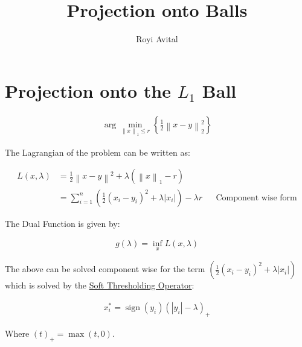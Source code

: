 \documentclass[]{article}
\title{Projection onto Balls}
\author{Royi Avital}
\DeclareMathOperator{\sign}{sign}
\newcommand{\MyBrace}[1]{\left\lbrace #1 \right\rbrace}
\newcommand{\MyNorm}[2]{{\left\| #1 \right\|}_{#2}}
\newcommand{\MyNormSqr}[2]{{\left\| #1 \right\|}_{#2}^{2}}
\newcommand{\MyNormTwoSqr}[1]{\MyNormSqr{#1}{2}}
\begin{document}
	
	\maketitle
	

	\tableofcontents
	
	\newpage
	
	\section{Projection onto the $ {L}_{1} $ Ball}
	\begin{align*}
	\arg \min_{ \MyNorm{x}{1} \leq r } \MyBrace{ \frac{1}{2} \MyNormTwoSqr{ x - y } }
	\end{align*}
	
	The Lagrangian of the problem can be written as:
	
	
	\begin{align*}
	L \left( x, \lambda \right) & = \frac{1}{2} {\left\| x - y \right\|}^{2} + \lambda \left( {\left\| x \right\|}_{1} - r \right) && \text{} \\
	& = \sum_{i = 1}^{n} \left( \frac{1}{2} { \left( {x}_{i} - {y}_{i} \right) }^{2} + \lambda \left| {x}_{i} \right| \right) - \lambda r && \text{Component wise form}
	\end{align*}
	
	The Dual Function is given by:
	
	\begin{align*}
	g \left( \lambda \right) = \inf_{x} L \left( x, \lambda \right)
	\end{align*}
	
	The above can be solved component wise for the term $ \left( \frac{1}{2} { \left( {x}_{i} - {y}_{i} \right) }^{2} + \lambda \left| {x}_{i} \right| \right) $ which is solved by the \href{https://en.wikipedia.org/wiki/Proximal_gradient_methods_for_learning#Solving_for_.7F.27.22.60UNIQ--postMath-0000002A-QINU.60.22.27.7F_proximity_operator}{Soft Thresholding Operator}:
	
	\begin{align*}
	{x}_{i}^{\ast} = \sign \left( {y}_{i} \right) { \left( \left| {y}_{i} \right| - \lambda \right) }_{+}
	\end{align*}
	
	Where $ {\left( t \right)}_{+} = \max \left( t, 0 \right) $.
	
\end{document}
